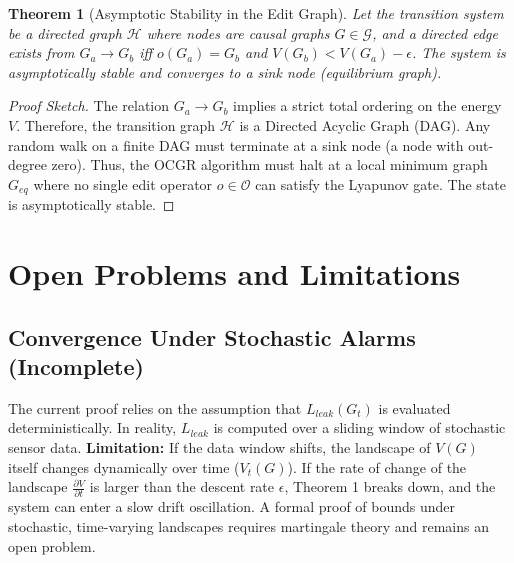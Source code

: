 \documentclass{article}
\newtheorem{theorem}{Theorem}
\begin{document}
\begin{theorem}[Asymptotic Stability in the Edit Graph]
Let the transition system be a directed graph $\mathcal{H}$ where nodes are causal graphs $G \in \mathcal{G}$, and a directed edge exists from $G_a \to G_b$ iff $o(G_a) = G_b$ and $V(G_b) < V(G_a) - \epsilon$. The system is asymptotically stable and converges to a sink node (equilibrium graph).
\end{theorem}

\begin{proof}[Proof Sketch]
The relation $G_a \to G_b$ implies a strict total ordering on the energy $V$. Therefore, the transition graph $\mathcal{H}$ is a Directed Acyclic Graph (DAG). 
Any random walk on a finite DAG must terminate at a sink node (a node with out-degree zero). Thus, the OCGR algorithm must halt at a local minimum graph $G_{eq}$ where no single edit operator $o \in \mathcal{O}$ can satisfy the Lyapunov gate. The state is asymptotically stable.
\end{proof}

\section{Open Problems and Limitations}

\subsection{Convergence Under Stochastic Alarms (Incomplete)}
The current proof relies on the assumption that $L_{leak}(G_t)$ is evaluated deterministically. In reality, $L_{leak}$ is computed over a sliding window of stochastic sensor data. 
\textbf{Limitation:} If the data window shifts, the landscape of $V(G)$ itself changes dynamically over time ($V_t(G)$). 
If the rate of change of the landscape $\frac{\partial V}{\partial t}$ is larger than the descent rate $\epsilon$, Theorem 1 breaks down, and the system can enter a slow drift oscillation. A formal proof of bounds under stochastic, time-varying landscapes requires martingale theory and remains an open problem.
\end{document}

